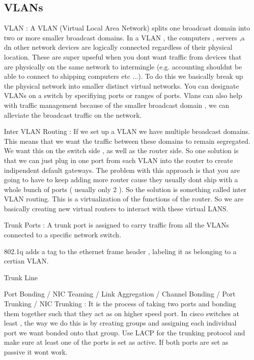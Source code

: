 \subsectionend

\subsection{VLANs}
\label{ssec:vlans}

VLAN : A VLAN (Virtual Local Area Network) splits one broadcast domain into two
or more smaller broadcast domains. In a VLAN , the computers , servers ,a dn
other network devices are logically connected regardless of their physical
location. These are super upseful when you dont want traffic from devices that
are physically on the same network to intermingle (e.g. accounting shouldnt be
able to connect to shipping computers etc ...). To do this we basically break up
the physical network into smaller distinct virtual networks. You can designate
VLANs on a switch by specifiying ports or ranges of ports. Vlans can also help
with traffic management because of the smaller broadcast domain , we can
alleviate the broadcast traffic on the network.


Inter VLAN Routing : If we set up a VLAN we have multiple broadcast domains.
This means that we want the traffic between these domains to remain segregated.
We want this on the switch side , as well as the router side. So one solution is
that we can just plug in one port from each VLAN into the router to create
indipendent default gateways. The problem with this approach is that you are
going to have to keep adding more router cause they usually dont ship with a
whole bunch of ports ( usually only 2 ). So the solution is something called
inter VLAN routing.  This is a virtualization of the functions of the router. So
we are basically  creating new virtual routers to interact with these virtual
LANS.


Trunk Ports : A trunk port is assigned to carry traffic from all the VLANs
connected to a specific network switch.

802.1q adds a tag to the ethernet frame header , labeling it as belonging to a
certian VLAN.

Trunk Line

Port Bonding / NIC Teaming / Link Aggregation / Channel Bonding / Port Trunking
/ NIC Trunking : It is the process of taking two ports and bonding them
together such that they act as on higher speed port. In cisco switches at least
, the way we do this is by creating groups and assigning each individual port we
want bonded onto that group. Use LACP for the trunking protocol and make sure at
least one of the ports is set as active. If both ports are set as passive it
wont work.

